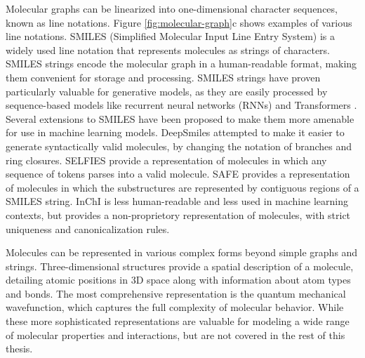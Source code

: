 Molecular graphs can be linearized into one-dimensional character sequences, known as line
notations. Figure \ref{fig:molecular-graph}c shows examples of various line notations. SMILES
(Simplified Molecular Input Line Entry System) \citep{weiningerSMILESChemicalLanguage1988} is a
widely used line notation that represents molecules as strings of characters. SMILES strings encode
the molecular graph in a human-readable format, making them convenient for storage and processing.
SMILES strings have proven particularly valuable for generative models, as they are easily processed
by sequence-based models like recurrent neural networks (RNNs) and Transformers
\citep{vaswaniAttentionAllYou2017}. Several extensions to SMILES have been proposed to make them
more amenable for use in machine learning models. DeepSmiles
\citep{oboyleDeepSMILESAdaptationSMILES2018} attempted to make it easier to generate syntactically
valid molecules, by changing the notation of branches and ring closures. SELFIES
\citep{krennSELFIESFutureMolecular2022} provide a representation of molecules in which any sequence
of tokens parses into a valid molecule. SAFE \citep{noutahiGottaBeSAFE2023} provides a
representation of molecules in which the substructures are represented by contiguous regions of a
SMILES string. InChI \citep{hellerInChIIUPACInternational2015} is less human-readable and less used
in machine learning contexts, but provides a non-proprietory representation of molecules, with
strict uniqueness and canonicalization rules.

Molecules can be represented in various complex forms beyond simple graphs and strings.
Three-dimensional structures provide a spatial description of a molecule, detailing atomic positions
in 3D space along with information about atom types and bonds. The most comprehensive representation
is the quantum mechanical wavefunction, which captures the full complexity of molecular behavior.
While these more sophisticated representations are valuable for modeling a wide range of molecular
properties and interactions, but are not covered in the rest of this thesis.

